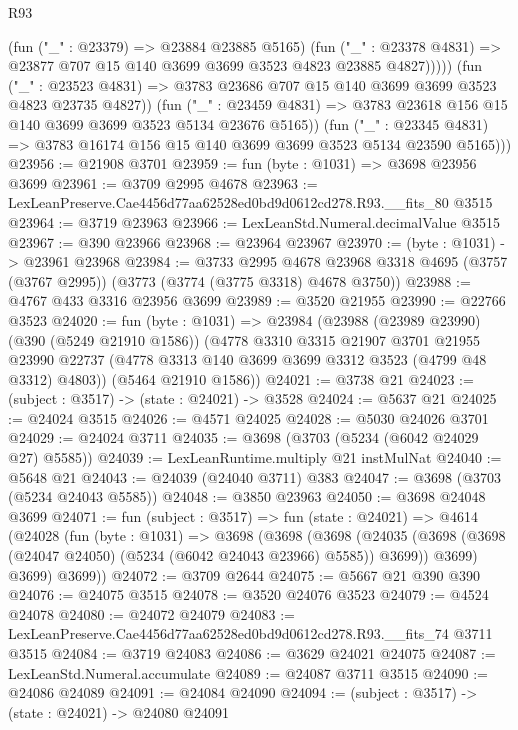 \begin{lexlean}{R93}
\begin{coremodule}
                    (fun ("_" : @23379) => @23884 @23885 @5165)
                    (fun ("_" : @23378 @4831) =>
                    @23877 @707 @15 @140 @3699 @3699 @3523 @4823 @23885 @4827)))))
            (fun ("_" : @23523 @4831) =>
            @3783 @23686 @707 @15 @140 @3699 @3699 @3523 @4823 @23735 @4827))
          (fun ("_" : @23459 @4831) =>
          @3783 @23618 @156 @15 @140 @3699 @3699 @3523 @5134 @23676 @5165))
        (fun ("_" : @23345 @4831) =>
        @3783 @16174 @156 @15 @140 @3699 @3699 @3523 @5134 @23590 @5165)))
@23956 := @21908 @3701
@23959 := fun (byte : @1031) => @3698 @23956 @3699
@23961 := @3709 @2995 @4678
@23963 := LexLeanPreserve.Cae4456d77aa62528ed0bd9d0612cd278.R93.__fits_80 @3515
@23964 := @3719 @23963
@23966 := LexLeanStd.Numeral.decimalValue @3515
@23967 := @390 @23966
@23968 := @23964 @23967
@23970 := (byte : @1031) -> @23961 @23968
@23984 := @3733
    @2995
    @4678
    @23968
    @3318
    @4695
    (@3757 (@3767 @2995))
    (@3773 (@3774 (@3775 @3318) @4678 @3750))
@23988 := @4767 @433 @3316 @23956 @3699
@23989 := @3520 @21955
@23990 := @22766 @3523
@24020 := fun (byte : @1031) =>
  @23984
    (@23988
      (@23989 @23990)
      (@390 (@5249 @21910 @1586))
      (@4778
        @3310
        @3315
        @21907
        @3701
        @21955
        @23990
        @22737
        (@4778 @3313 @140 @3699 @3699 @3312 @3523 (@4799 @48 @3312) @4803))
      (@5464 @21910 @1586))
@24021 := @3738 @21
@24023 := (subject : @3517) -> (state : @24021) -> @3528
@24024 := @5637 @21
@24025 := @24024 @3515
@24026 := @4571 @24025
@24028 := @5030 @24026 @3701
@24029 := @24024 @3711
@24035 := @3698 (@3703 (@5234 (@6042 @24029 @27) @5585))
@24039 := LexLeanRuntime.multiply @21 instMulNat
@24040 := @5648 @21
@24043 := @24039 (@24040 @3711) @383
@24047 := @3698 (@3703 (@5234 @24043 @5585))
@24048 := @3850 @23963
@24050 := @3698 @24048 @3699
@24071 := fun (subject : @3517) =>
  fun (state : @24021) =>
  @4614
    (@24028
      (fun (byte : @1031) =>
      @3698
        (@3698
          (@3698
            (@24035 (@3698 (@3698 (@24047 @24050) (@5234 (@6042 @24043 @23966) @5585)) @3699))
            @3699)
          @3699)
        @3699))
@24072 := @3709 @2644
@24075 := @5667 @21 @390 @390
@24076 := @24075 @3515
@24078 := @3520 @24076 @3523
@24079 := @4524 @24078
@24080 := @24072 @24079
@24083 := LexLeanPreserve.Cae4456d77aa62528ed0bd9d0612cd278.R93.__fits_74 @3711 @3515
@24084 := @3719 @24083
@24086 := @3629 @24021 @24075
@24087 := LexLeanStd.Numeral.accumulate
@24089 := @24087 @3711 @3515
@24090 := @24086 @24089
@24091 := @24084 @24090
@24094 := (subject : @3517) -> (state : @24021) -> @24080 @24091

\end{coremodule}
\end{lexlean}
